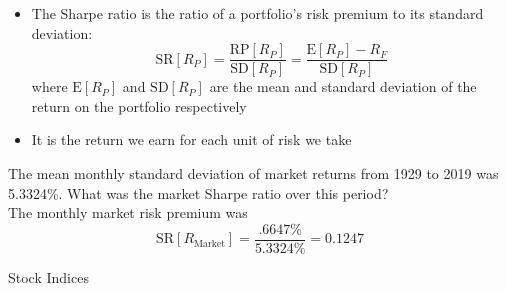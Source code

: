 \documentclass{beamer}
\begin{document}
\begin{frame}{}
	\begin{itemize}
		\item The Sharpe ratio is the ratio of a portfolio's risk premium to its standard deviation:
			\begin{equation*}
				\text{SR}[R_{P}]=\frac{\text{RP}[R_{P}]}{\text{SD}[R_{P}]}=\frac{\text{E}[R_{P}]-R_{F}}{\text{SD}[R_{P}]}
			\end{equation*}
			where $\text{E}[R_{P}]$ and $\text{SD}[R_{P}]$ are the mean and standard deviation of the return on the portfolio respectively 
		\item It is the return we earn for each unit of risk we take
	\end{itemize}
\end{frame}

\begin{frame}{}
	The mean monthly standard deviation of market returns from 1929 to 2019 was 5.3324\%. What was the market Sharpe ratio over this period?\\
	\pause
	{\color{blue}
		The monthly market risk premium was
		\begin{equation*}
			\text{SR}[R_{\text{Market}}]=\frac{.6647\%}{5.3324\%}=0.1247
		\end{equation*}
}
\end{frame}

\iffalse
\begin{frame}
\begin{center}
\Huge Stock Indices
\end{center}
\end{frame}
\end{document}
